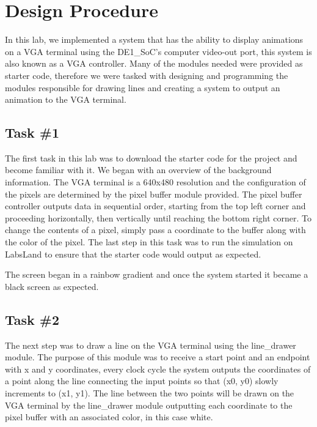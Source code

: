 \documentclass[11pt, titlepage]{article}
\author{Donovan Clay (ID: 2276005), Cameron Jennings (ID: 2029631)}
\title{\assignmentname}
\date{\parbox{\linewidth}{\centering
\experimentDate
  \endgraf\bigskip
  \className\
}}
\begin{document}
	\maketitle
 
    \setcounter{tocdepth}{2}
    \begin{center}
        \tableofcontents\label{beginning}
    \end{center}
    \newpage
    
    \section{Design Procedure}
        In this lab, we implemented a system that has the ability to display animations on a VGA terminal using the DE1\_SoC's computer video-out port, this system is also known as a VGA controller. Many of the modules needed were provided as starter code, therefore we were tasked with designing and programming the modules responsible for drawing lines and creating a system to output an animation to the VGA terminal.
        
        \subsection{Task \#1}
            The first task in this lab was to download the starter code for the project and become familiar with it. We began with an overview of the background information. The VGA terminal is a 640x480 resolution and the configuration of the pixels are determined by the pixel buffer module provided. The pixel buffer controller outputs data in sequential order, starting from the top left corner and proceeding horizontally, then vertically until reaching the bottom right corner. To change the contents of a pixel, simply pass a coordinate to the buffer along with the color of the pixel. The last step in this task was to run the simulation on LabsLand to ensure that the starter code would output as expected.

            The screen began in a rainbow gradient and once the system started it became a black screen as expected.
        \subsection{Task \#2}
            The next step was to draw a line on the VGA terminal using the line\_drawer module. The purpose of this module was to receive a start point and an endpoint with x and y coordinates, every clock cycle the system outputs the coordinates of a point along the line connecting the input points so that (x0, y0) slowly increments to (x1, y1). The line between the two points will be drawn on the VGA terminal by the line\_drawer module outputting each coordinate to the pixel buffer with an associated color, in this case white. 
\end{document}
